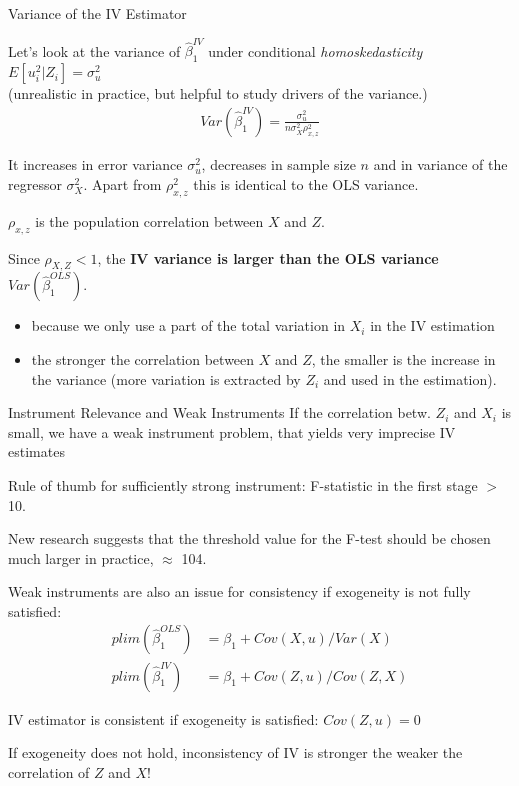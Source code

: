 \documentclass[11pt, aspectratio = 169]{beamer}
\begin{document}
\begin{frame}{Variance of the IV Estimator}

Let's look at the variance of $\hat{\beta}_1^{IV}$ under conditional \emph{homoskedasticity} $E[u_i^2| Z_i] = \sigma_u^2$ \\
(unrealistic in practice, but helpful to study drivers of the variance.)
\begin{align*}
    Var(\hat{\beta}_1^{IV}) = \frac{\sigma_u^2}{n \sigma_X^2 \rho_{x,z}^2}
\end{align*}


It increases in error variance \color{red}$\sigma_u^2$\color{black}, decreases in sample size \color{teal}$n$ \color{black} and in variance of the regressor \color{teal}$\sigma_X^2$\color{black}. Apart from  $\rho_{x,z}^2$ this is identical to the OLS variance. 


\color{teal}$\rho_{x,z}$ \color{black} is the population correlation between $X$ and $Z$.


Since $\rho_{X, Z} < 1$, the \textbf{\alert{IV variance is larger than the OLS variance}} $Var(\hat{\beta}_1^{OLS})$. \\
\begin{itemize}
    \item because we only use a part of the total variation in $X_i$ in the IV estimation
    \item the stronger the correlation between $X$ and $Z$, the smaller is the increase in the variance (more variation is extracted by $Z_i$ and used in the estimation).
\end{itemize}
\end{frame}

\begin{frame}{Instrument Relevance and Weak Instruments}
    If the correlation betw. $Z_i$ and $X_i$ is small, we have a \alert{weak instrument} problem, that yields very imprecise IV estimates


    Rule of thumb for sufficiently strong instrument:  F-statistic in the first stage $>$ 10.

    New research suggests that the threshold value for the
F-test should be chosen much larger in practice, $\approx$ 104.
    \bigskip


\pause 
Weak instruments are also an issue for consistency if exogeneity is not fully satisfied:
\begin{align*}
    plim(\hat{\beta}_1^{OLS}) &= \beta_1 + Cov (X, u)/Var(X)   \\
plim(\hat{\beta}_1^{IV}) &= \beta_1 + Cov (Z, u)/Cov(Z,X)
\end{align*}

IV estimator is consistent if exogeneity is satisfied: $Cov(Z, u) = 0$

If exogeneity does not hold, inconsistency of IV is stronger the weaker the correlation of $Z$ and $X$!


\end{frame}
\end{document}
